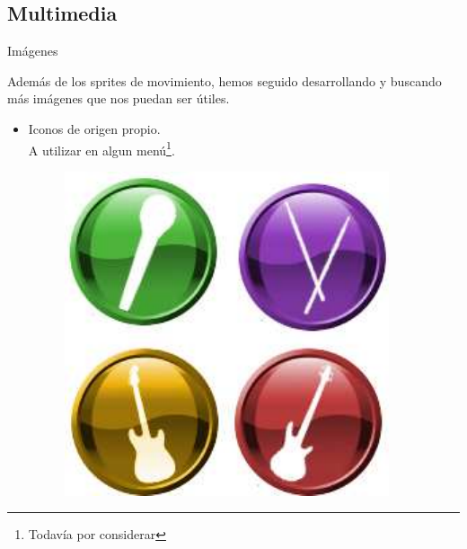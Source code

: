 \documentclass[9pt,xcolor=svgnames]{beamer}
\begin{document}
  
  \subsection{Multimedia}

  
  \begin{frame}{Imágenes}

   Además de los sprites de movimiento, hemos seguido desarrollando y
   buscando más imágenes que nos puedan ser útiles.\\

   \begin{itemize}
    \item Iconos de origen propio.\\
	  A utilizar en algun menú\footnote{Todavía por considerar}.
	  
	  \begin{figure}[t]
	   \includegraphics[scale=0.6]{./Imagenes/iconos.pdf}
	  \end{figure}
	  
   \end{itemize}

  \end{frame}
\end{document}
